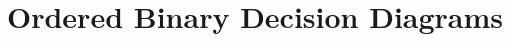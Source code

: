 \newenvironment{boxfig}[2]{\begin{figure}[#1]\fbox{\begin{minipage}{0.97\linewidth}
                        \vspace{0.2em}
                        \makebox[0.02\linewidth]{}
                        \begin{minipage}{0.94\linewidth}
            {\small{
                        #2 }}
                        \end{minipage}
                        \vspace{0.2em}
                        \end{minipage}}}{\end{figure}}

\newenvironment{boxfig*}[2]{\begin{figure*}[#1]\fbox{\begin{minipage}{0.97\linewidth}
                        \vspace{0.2em}
                        \makebox[0.02\linewidth]{}
                        \begin{minipage}{0.94\linewidth}
            {\small{
                        #2 }}
                        \end{minipage}
                        \vspace{0.2em}
                        \end{minipage}}}{\end{figure*}}


\newcommand{\alg}[1]{\ensuremath{\mathsf{#1}}}

\newcommand{\binset}{\{0,1\}}
\newcommand{\rfrom}{\ensuremath{\stackrel{\mathrm{R}}{\gets}}}
\newcommand{\from}{\ensuremath{{\gets}}}
\newcommand{\adver}{{\mathcal{A}}}
\newcommand{\disting}{{\mathcal{D}}}
\newcommand{\simu}{{\mathcal{S}}}

\chapter{Ordered Binary Decision Diagrams}
\label{chapter:obdd}





%

\begin{comment}
 


\appendix


\end{comment}
